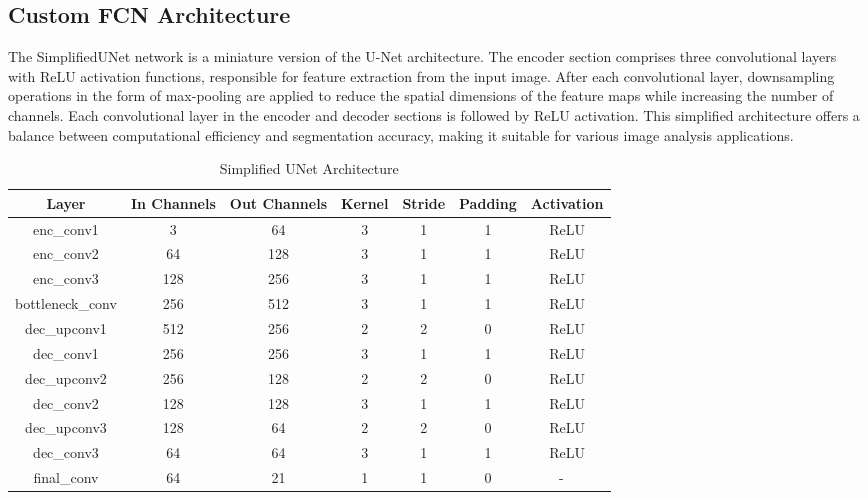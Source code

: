 \documentclass{article}
\begin{document}
\subsection{Custom FCN Architecture}
The SimplifiedUNet network is a miniature version of the U-Net architecture. The encoder section comprises three convolutional layers with ReLU activation functions, responsible for feature extraction from the input image. After each convolutional layer, downsampling operations in the form of max-pooling are applied to reduce the spatial dimensions of the feature maps while increasing the number of channels.  Each convolutional layer in the encoder and decoder sections is followed by ReLU activation. This simplified architecture offers a balance between computational efficiency and segmentation accuracy, making it suitable for various image analysis applications.
\begin{table}[h]
  \centering
  \renewcommand{\arraystretch}{1.5}
  \begin{tabular}{|c|c|c|c|c|c|c|}
    \hline
    Layer           & In Channels & Out Channels & Kernel & Stride & Padding & Activation \\
    \hline
    enc\_conv1       & 3           & 64           & 3      & 1      & 1       & ReLU \\\hline
    enc\_conv2       & 64          & 128          & 3      & 1      & 1       & ReLU \\\hline
    enc\_conv3       & 128         & 256          & 3      & 1      & 1       & ReLU \\\hline
    bottleneck\_conv & 256         & 512          & 3      & 1      & 1       & ReLU \\\hline
    dec\_upconv1     & 512         & 256          & 2      & 2      & 0       & ReLU \\\hline
    dec\_conv1       & 256         & 256          & 3      & 1      & 1       & ReLU \\\hline
    dec\_upconv2     & 256         & 128          & 2      & 2      & 0       & ReLU \\\hline
    dec\_conv2       & 128         & 128          & 3      & 1      & 1       & ReLU \\\hline
    dec\_upconv3     & 128         & 64           & 2      & 2      & 0       & ReLU \\\hline
    dec\_conv3       & 64          & 64           & 3      & 1      & 1       & ReLU \\\hline
    final\_conv      & 64          & 21           & 1      & 1      & 0       & - \
    \\\hline
  \end{tabular}
  \caption{Simplified UNet Architecture}
  \label{tab:simplified_unet_architecture}
\end{table}
\end{document}
